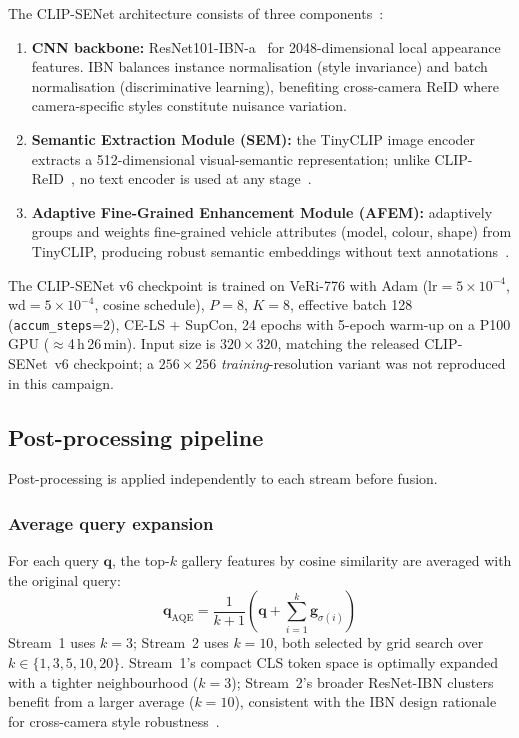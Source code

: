 \documentclass[10pt,a4paper]{article}
\begin{document}
The CLIP-SENet architecture consists of three
components~\cite{lu2025clipsenet}:
\begin{enumerate}
  \item \textbf{CNN backbone:} ResNet101-IBN-a~\cite{pan2018ibn} for
    2048-dimensional local appearance features. IBN balances instance
    normalisation (style invariance) and batch normalisation (discriminative
    learning), benefiting cross-camera ReID where camera-specific styles
    constitute nuisance variation.
  \item \textbf{Semantic Extraction Module (SEM):} the TinyCLIP image encoder
    extracts a 512-dimensional visual-semantic representation; unlike
    CLIP-ReID~\cite{li2023clipreid}, no text encoder is used at any
    stage~\cite{lu2025clipsenet}.
  \item \textbf{Adaptive Fine-Grained Enhancement Module (AFEM):} adaptively
    groups and weights fine-grained vehicle attributes (model, colour, shape)
    from TinyCLIP, producing robust semantic embeddings without text
    annotations~\cite{lu2025clipsenet}.
\end{enumerate}

The CLIP-SENet v6 checkpoint is trained on VeRi-776 with Adam
($\mathrm{lr}\!=\!5\!\times\!10^{-4}$, wd$=\!5\!\times\!10^{-4}$, cosine
schedule), $P\!=\!8$, $K\!=\!8$, effective batch 128 (\texttt{accum\_steps}=2),
CE-LS $+$ SupCon, 24 epochs with 5-epoch warm-up on a P100 GPU
($\approx$4\,h\,26\,min). Input size is $320\!\times\!320$, matching the
released CLIP-SENet~v6 checkpoint; a $256\!\times\!256$
\emph{training}-resolution variant was not reproduced in this campaign.

\subsection{Post-processing pipeline}
Post-processing is applied independently to each stream before fusion.

\subsubsection{Average query expansion}
For each query $\mathbf{q}$, the top-$k$ gallery features by cosine similarity
are averaged with the original query:
\begin{equation}
  \mathbf{q}_{\mathrm{AQE}} =
    \frac{1}{k{+}1}\!\left(\mathbf{q} + \sum_{i=1}^{k} \mathbf{g}_{\sigma(i)}\right)
  \label{eq:aqe}
\end{equation}
Stream~1 uses $k{=}3$; Stream~2 uses $k{=}10$, both selected by grid search
over $k\in\{1,3,5,10,20\}$. Stream~1's compact CLS token space is optimally
expanded with a tighter neighbourhood ($k{=}3$); Stream~2's broader ResNet-IBN
clusters benefit from a larger average ($k{=}10$), consistent with the IBN
design rationale for cross-camera style robustness~\cite{pan2018ibn}.
\end{document}
